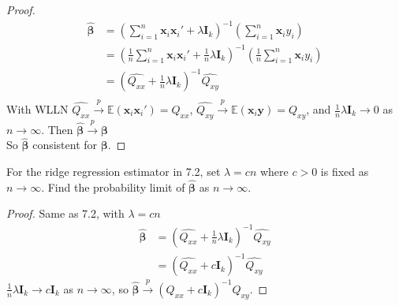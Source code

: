 \documentclass[12pt]{article}
\newenvironment{question}[2][Question]{\begin{trivlist}
\item[\hskip \labelsep {\bmseries #1}\hskip \labelsep {\bmseries #2.}]}{\end{trivlist}}
\begin{document}
\begin{proof}
\begin{align*}
\hat{\bm{\beta}}& = (\sum_{i = 1}^{n}\bm{x}_i\bm{x}_i'+\lambda\bm{I}_k)^{-1}(\sum_{i = 1}^n\bm{x}_i y_i)\\
& = (\frac{1}{n}\sum_{i = 1}^{n}\bm{x}_i\bm{x}_i'+\frac{1}{n}\lambda\bm{I}_k)^{-1}(\frac{1}{n}\sum_{i = 1}^n\bm{x}_i y_i)\\
&=(\hat{Q_{xx}}+\frac{1}{n}\lambda\bm{I}_k)^{-1}\hat{Q_{xy}}\\
\end{align*}
With WLLN $\hat{Q_{xx}}\xrightarrow{p} \mathbb{E}(\bm{x}_i\bm{x}_i') = Q_{xx}$, $\hat{Q_{xy}}\xrightarrow{p} \mathbb{E}(\bm{x}_i\bm{y}) = Q_{xy}$, and $\frac{1}{n}\lambda\bm{I}_k \to 0$ as $n\to \infty$. Then $\hat{\bm{\beta}}\xrightarrow{p}\bm{\beta} $\\
So $\hat{\bm{\beta}}$ consistent for $\bm{\beta}$.
\end{proof}

\begin{question}{7.3}
For the ridge regression estimator in 7.2, set $\lambda = c n$ where $c>0$ is fixed as $n\to \infty$. Find the probability limit of $\hat{\bm{\beta}}$ as $n\to \infty$. 
\end{question}

\begin{proof}
Same as 7.2, with $\lambda = cn$
\begin{align*}
\hat{\bm{\beta}}
&=(\hat{Q_{xx}}+\frac{1}{n}\lambda\bm{I}_k)^{-1}\hat{Q_{xy}}\\
&=(\hat{Q_{xx}}+c\bm{I}_k)^{-1}\hat{Q_{xy}}
\end{align*}
$\frac{1}{n}\lambda\bm{I}_k \to c\bm{I}_k $ as $n\to \infty$, so $\hat{\bm{\beta}}\xrightarrow{p}(Q_{xx}+ c\bm{I}_k)^{-1}Q_{xy}$.
\end{proof}
\end{document}
